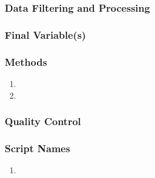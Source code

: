 \subsubsection*{Data Filtering and Processing}

\subsubsection*{Final Variable(s)}

\subsubsection*{Methods}

\begin{enumerate}[nolistsep]
\item
\item
\end{enumerate}

\subsubsection*{Quality Control}

\subsubsection*{Script Names}

\begin{enumerate}[nolistsep]
\item
\end{enumerate}


